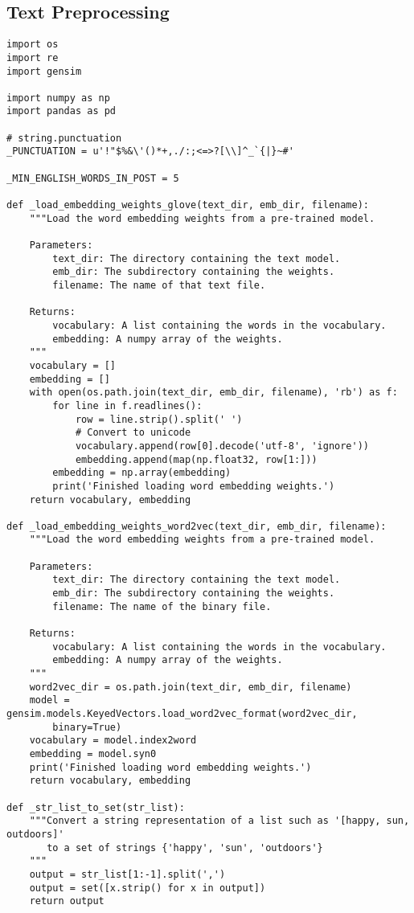 \subsection{Text Preprocessing}
\begin{lstlisting}
import os
import re
import gensim

import numpy as np
import pandas as pd

# string.punctuation
_PUNCTUATION = u'!"$%&\'()*+,./:;<=>?[\\]^_`{|}~#'

_MIN_ENGLISH_WORDS_IN_POST = 5

def _load_embedding_weights_glove(text_dir, emb_dir, filename):
    """Load the word embedding weights from a pre-trained model.
    
    Parameters:
        text_dir: The directory containing the text model.
        emb_dir: The subdirectory containing the weights.
        filename: The name of that text file.
        
    Returns:
        vocabulary: A list containing the words in the vocabulary.
        embedding: A numpy array of the weights.
    """
    vocabulary = []
    embedding = []
    with open(os.path.join(text_dir, emb_dir, filename), 'rb') as f:
        for line in f.readlines():
            row = line.strip().split(' ')
            # Convert to unicode
            vocabulary.append(row[0].decode('utf-8', 'ignore'))
            embedding.append(map(np.float32, row[1:]))
        embedding = np.array(embedding)
        print('Finished loading word embedding weights.')
    return vocabulary, embedding

def _load_embedding_weights_word2vec(text_dir, emb_dir, filename):
    """Load the word embedding weights from a pre-trained model.
    
    Parameters:
        text_dir: The directory containing the text model.
        emb_dir: The subdirectory containing the weights.
        filename: The name of the binary file.
        
    Returns:
        vocabulary: A list containing the words in the vocabulary.
        embedding: A numpy array of the weights.
    """
    word2vec_dir = os.path.join(text_dir, emb_dir, filename)
    model = gensim.models.KeyedVectors.load_word2vec_format(word2vec_dir, 
        binary=True)
    vocabulary = model.index2word
    embedding = model.syn0
    print('Finished loading word embedding weights.')
    return vocabulary, embedding

def _str_list_to_set(str_list):
    """Convert a string representation of a list such as '[happy, sun, outdoors]'
       to a set of strings {'happy', 'sun', 'outdoors'}
    """
    output = str_list[1:-1].split(',')
    output = set([x.strip() for x in output])
    return output


\end{lstlisting}
